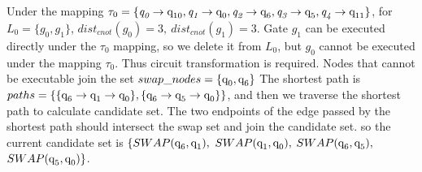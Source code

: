 \documentclass[runningheads]{llncs}
\begin{document}
\begin{example}
	Under the mapping $\tau_{0}=\{\textit{q}_\textit{0}\rightarrow  \textup{q}_{\textup{10}},\textit{q}_\textit{1}\rightarrow \textup{q}_{\textup{0}},
\textit{q}_\textit{2}\rightarrow  \textup{q}_{\textup{6}},\textit{q}_\textit{3}\rightarrow  \textup{q}_{\textup{5}},\textit{q}_\textit{4}\rightarrow  \textup{q}_{\textup{11}}\}$, 
for $L_{0}=\{g_{0},g_{1}\}$, $dist_{cnot}(g_{0})=3,\ dist_{cnot}(g_{1})=3$. 
Gate $g_{1}$ can be executed directly under the $\tau_{0}$ mapping, so we delete it from $L_{0}$,
but $g_{0}$ cannot be executed under the mapping $\tau_{0}$.
Thus circuit transformation is required. 
Nodes that cannot be executable join the set $swap\_nodes=\{\textup{q}_{\textup{0}},\textup{q}_\textup{6}\}$
The shortest path is $paths=\{\{\textup{q}_{\textup{6}}\rightarrow \textup{q}_{\textup{1}} \rightarrow \textup{q}_{0} \},\{\textup{q}_\textup{6}\rightarrow \textup{q}_\textup{5} \rightarrow \textup{q}_\textup{0} \}\}$, 
and then we traverse the shortest path to calculate candidate set.
The two endpoints of the edge passed by the shortest path should intersect the swap set and join the candidate set.
so the current candidate set is $\{SWAP(\textup{q}_\textup{6},\textup{q}_\textup{1}),$ $SWAP(\textup{q}_\textup{1},\textup{q}_\textup{0}),$ $SWAP(\textup{q}_\textup{6},\textup{q}_\textup{5}),$ $SWAP(\textup{q}_\textup{5},\textup{q}_\textup{0}) \}$.
\end{example}
\end{document}
